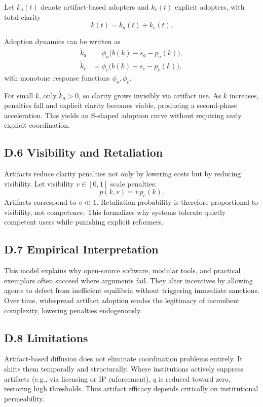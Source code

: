 \documentclass[11pt]{article}
\begin{document}
Let \(k_a(t)\) denote artifact-based adopters and \(k_e(t)\) explicit adopters, with total clarity
\[
k(t) = k_a(t) + k_e(t).
\]

Adoption dynamics can be written as
\begin{align}
\dot{k}_a &= \phi_a\big(b(k) - s_a - p_a(k)\big), \\
\dot{k}_e &= \phi_e\big(b(k) - s_e - p_e(k)\big),
\end{align}
with monotone response functions \(\phi_a,\phi_e\).

For small \(k\), only \(\dot{k}_a>0\), so clarity grows invisibly via artifact use. As \(k\) increases, penalties fall and explicit clarity becomes viable, producing a second-phase acceleration. This yields an S-shaped adoption curve without requiring early explicit coordination.

\subsection{D.6 Visibility and Retaliation}

Artifacts reduce clarity penalties not only by lowering costs but by reducing visibility. Let visibility \(v \in [0,1]\) scale penalties:
\[
p(k,v) = v\,p_e(k).
\]
Artifacts correspond to \(v \ll 1\). Retaliation probability is therefore proportional to visibility, not competence. This formalizes why systems tolerate quietly competent users while punishing explicit reformers.

\subsection{D.7 Empirical Interpretation}

This model explains why open-source software, modular tools, and practical exemplars often succeed where arguments fail. They alter incentives by allowing agents to defect from inefficient equilibria without triggering immediate sanctions. Over time, widespread artifact adoption erodes the legitimacy of incumbent complexity, lowering penalties endogenously.

\subsection{D.8 Limitations}

Artifact-based diffusion does not eliminate coordination problems entirely. It shifts them temporally and structurally. Where institutions actively suppress artifacts (e.g., via licensing or IP enforcement), \(q\) is reduced toward zero, restoring high thresholds. Thus artifact efficacy depends critically on institutional permeability.
\end{document}
